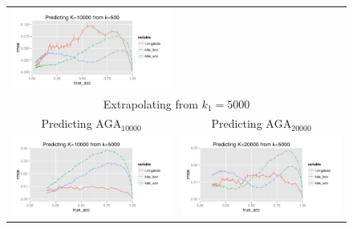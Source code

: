 \documentclass[twoside,11pt]{article}
\newenvironment{myfont}{\fontfamily{phv}\selectfont}{\par}
\begin{document}
\begin{figure}
\begin{tabular}{cc}
\includegraphics[scale = 0.55, clip = true, trim = 0 0 0 0.45in]{sim_large7_K10_k0_5.png}\\ 
\multicolumn{2}{c}{\begin{myfont}Extrapolating from $k_1 = 5000$\end{myfont}}\\
\begin{myfont}Predicting $\text{AGA}_{10000}$\end{myfont} &
\begin{myfont}Predicting $\text{AGA}_{20000}$\end{myfont}\\
\includegraphics[scale = 0.55, clip = true, trim = 0 0 1.25in 0.45in]{sim_large7_K10_k5.png} &
\includegraphics[scale = 0.55, clip = true, trim = 0 0 0 0.45in]{sim_large7_K20_k5.png}\\

\end{tabular}
\end{figure}
\end{document}
